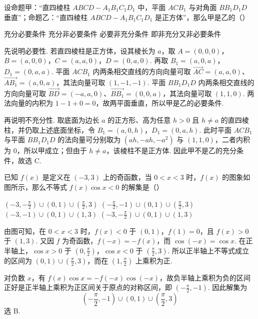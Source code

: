 \begin{problem}
设命题甲：“直四棱柱 \(ABCD-A_{1}B_{1}C_{1}D_{1}\) 中，平面 \(ACB_{1}\) 与对角面 \(BB_{1}D_{1}D\) 垂直”；命题乙：“直四棱柱 \(ABCD-A_{1}B_{1}C_{1}D_{1}\) 是正方体”，那么甲是乙的（\quad）

\choices
    {充分必要条件}
    {充分非必要条件}
    {必要非充分条件}
    {即非充分又非必要条件}

\begin{solution}
先说明必要性. 若直四棱柱是正方体，设其棱长为 \(a\)，取
\(A=(0,0,0)\)，\(B=(a,0,0)\)，\(C=(a,a,0)\)，\(D=(0,a,0)\).
再取 \(B_{1}=(a,0,a)\)，\(D_{1}=(0,a,a)\).
平面 \(ACB_{1}\) 内两条相交直线的方向向量可取 \(\overrightarrow{AC}=(a,a,0)\)、\(\overrightarrow{AB_{1}}=(a,0,a)\)，其法向量可取 \((1,-1,-1)\). 平面 \(BB_{1}D_{1}D\) 内两条相交直线的方向向量可取 \(\overrightarrow{BD}=(-a,a,0)\)、\(\overrightarrow{BB_{1}}=(0,0,a)\)，其法向量可取 \((1,1,0)\). 两法向量的内积为 \(1-1+0=0\)，故两平面垂直，所以甲是乙的必要条件.

再说明不充分性. 取底面为边长 \(a\) 的正方形、高为任意 \(h>0\) 且 \(h\ne a\) 的直四棱柱，并仍取上述底面坐标，令 \(B_{1}=(a,0,h)\)，\(D_{1}=(0,a,h)\). 此时平面 \(ACB_{1}\) 与平面 \(BB_{1}D_{1}D\) 的法向量可分别取为 \((ah,-ah,-a^{2})\) 与 \((1,1,0)\)，二者内积为 \(0\)，所以甲成立；但由于 \(h\ne a\)，该棱柱不是正方体. 因此甲不是乙的充分条件，故选 C.
\end{solution}
\end{problem}

\begin{problem}
已知 \(f(x)\) 是定义在 \((-3,3)\) 上的奇函数，当 \(0<x<3\) 时，\(f(x)\) 的图象如图所示，那么不等式 \(f(x)\cos x<0\) 的解集是（\quad）


\choices
    {\((-3,-\frac{\pi}{2})\cup(0,1)\cup(\frac{\pi}{2},3)\)}
    {\((-\frac{\pi}{2},-1)\cup(0,1)\cup(\frac{\pi}{2},3)\)}
    {\((-3,-1)\cup(0,1)\cup(1,3)\)}
    {\((-3,-\frac{\pi}{2})\cup(0,1)\cup(1,3)\)}

\begin{solution}
由图可知，在 \(0<x<3\) 时，\(f(x)<0\) 于 \((0,1)\)，\(f(1)=0\)，且 \(f(x)>0\) 于 \((1,3)\). 又因 \(f\) 为奇函数，\(f(-x)=-f(x)\)，而 \(\cos(-x)=\cos x\). 在正半轴上，\(\cos x>0\) 于 \((0,\frac\pi2)\)，\(\cos x<0\) 于 \((\frac\pi2,3)\). 所以正半轴上不等式成立的区间为 \((0,1)\cup(\frac\pi2,3)\)，而在 \((1,\frac\pi2)\) 上乘积为正.

对负数 \(x\)，有 \(f(x)\cos x=-f(-x)\cos(-x)\)，故负半轴上乘积为负的区间正好是正半轴上乘积为正区间关于原点的对称区间，即 \((-\frac\pi2,-1)\). 因此解集为
\[
\left(-\frac\pi2,-1\right)\cup(0,1)\cup\left(\frac\pi2,3\right)
\]
选 B.
\end{solution}
\end{problem}

